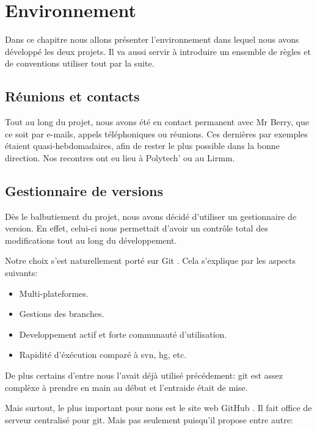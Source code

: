 \chapter{Environnement}
    Dans ce chapitre nous allons présenter l'environnement dans lequel nous avons
    développé les deux projets. Il va aussi servir à introduire un ensemble de
    règles et de conventions utiliser tout par la suite.

\newpage
    \section{Réunions et contacts}
        Tout au long du projet, nous avons été en contact permanent avec Mr Berry,
    que ce soit par e-mails, appels téléphoniques ou réunions. Ces dernières par
    exemples étaient quasi-hebdomadaires, afin de rester le plus possible dans la
    bonne direction. Nos recontres ont eu lieu à Polytech' ou au Lirmm.


    \section{Gestionnaire de versions}
        Dès le balbutiement du projet, nous avons décidé d'utiliser un gestionnaire
    de version. En effet, celui-ci nous permettait d'avoir un contrôle total des modifications
    tout au long du développement.

    Notre choix s'est naturellement porté sur Git \cite{git}. Cela s'explique 
    par les aspects suivants:

    \begin{itemize}
    \item Multi-plateformes.
    \item Gestions des branches.
    \item Developpement actif et forte communauté d'utilisation.
    \item Rapidité d'éxécution comparé à svn, hg, etc. 
    \end{itemize}

    De plus certains d'entre nous l'avait déjà utilisé précédement: git est assez
    complèxe à prendre en main au début et l'entraide était de mise.

    Mais surtout, le plus important pour nous est le site web GitHub \cite{github}.
    Il fait office de serveur centralisé pour git. Mais pas seulement puisqu'il 
    propose entre autre:

